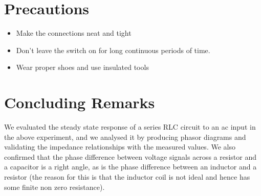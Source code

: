 \documentclass{article}
\begin{document}
\vspace{5px}

\section{Precautions}

\begin{itemize}
\item Make the connections neat and tight
\item Don’t leave the switch on for long continuous periods of time.
\item Wear proper shoes and use insulated tools
\end{itemize}

\vspace{5px}

\section{Concluding Remarks}
We evaluated the steady state response of a series RLC circuit to an ac input in the above experiment, and we analysed it by producing phasor diagrams and validating the impedance relationships with the measured values. We also confirmed that the phase difference between voltage signals across a resistor and a capacitor is a right angle, as is the phase difference between an inductor and a resistor (the reason for this is that the inductor coil is not ideal and hence has some finite non zero resistance).
\end{document}
